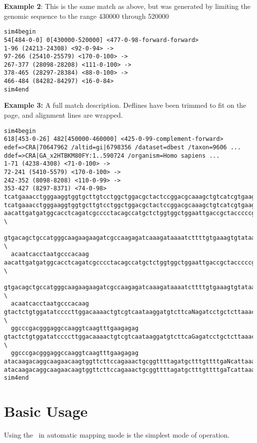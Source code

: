 \documentclass[twoside,11pt]{book}
\begin{document}
{\bf Example 2}: This is the same match as above, but was generated by
limiting the genomic sequence to the range 430000 through 520000

\footnotesize
\begin{verbatim}
sim4begin
54[484-0-0] 0[430000-520000] <477-0-98-forward-forward>
1-96 (24213-24308) <92-0-94> ->
97-266 (25410-25579) <170-0-100> ->
267-377 (28098-28208) <111-0-100> ->
378-465 (28297-28384) <88-0-100> ->
466-484 (84282-84297) <16-0-84>
sim4end
\end{verbatim}
\normalsize

{\bf Example 3:} A full match description.  Deflines have been trimmed
to fit on the page, and alignment lines are wrapped.

\footnotesize
\begin{verbatim}
sim4begin
618[453-0-26] 482[450000-460000] <425-0-99-complement-forward>
edef=>CRA|70647962 /altid=gi|6798356 /dataset=dbest /taxon=9606 ...
ddef=>CRA|GA_x2HTBKM80FY:1..590724 /organism=Homo sapiens ...
1-71 (4238-4308) <71-0-100> ->
72-241 (5410-5579) <170-0-100> ->
242-352 (8098-8208) <110-0-99> ->
353-427 (8297-8371) <74-0-98>
tcatgaaacctgggaaggtggtgcttgtcctggctggacgctactccggacgcaaagctgtcatcgtgaag
tcatgaaacctgggaaggtggtgcttgtcctggctggacgctactccggacgcaaagctgtcatcgtgaag
aacattgatgatggcacctcagatcgcccctacagccatgctctggtggctggaattgaccgctacccccgcaaa \
  gtgacagctgccatgggcaagaagaagatcgccaagagatcaaagataaaatcttttgtgaaagtgtataact \
  acaatcacctaatgcccacaag
aacattgatgatggcacctcagatcgcccctacagccatgctctggtggctggaattgaccgctacccccgcaaa \
  gtgacagctgccatgggcaagaagaagatcgccaagagatcaaagataaaatcttttgtgaaagtgtataact \
  acaatcacctaatgcccacaag
gtactctgtggatatccccttggacaaaactgtcgtcaataaggatgtcttcaNagatcctgctcttaaacgcaa \
  ggcccgacgggaggccaaggtcaagtttgaagagag
gtactctgtggatatccccttggacaaaactgtcgtcaataaggatgtcttcaGagatcctgctcttaaacgcaa \
  ggcccgacgggaggccaaggtcaagtttgaagagag
atacaagacaggcaagaacaagtggttcttccagaaactgcggttttagatgctttgttttgaNcattaaaaatt
atacaagacaggcaagaacaagtggttcttccagaaactgcggttttagatgctttgttttgaTcattaaaaatt
sim4end
\end{verbatim}
\normalsize


\chapter{Basic Usage}
\label{chap:basic}

Using the \ESTmapper\ in automatic mapping mode is the simplest mode of operation.
\end{document}

